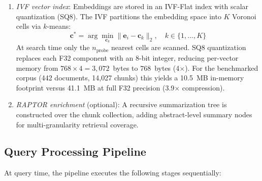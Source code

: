 \documentclass[conference]{IEEEtran}
\begin{document}
\begin{enumerate}
  \item \textit{IVF vector index}: Embeddings are stored in an IVF-Flat
        index with scalar quantization (SQ8). The IVF partitions the embedding
        space into $K$ Voronoi cells via $k$-means:
        \begin{equation}
          \mathbf{c}^* = \arg\min_{\mathbf{c}_k}
            \|\mathbf{e}_i - \mathbf{c}_k\|_2, \quad k \in \{1,\ldots,K\}
          \label{eq:ivf}
        \end{equation}
        At search time only the $n_{\text{probe}}$ nearest cells are scanned.
        SQ8 quantization replaces each F32 component with an 8-bit integer,
        reducing per-vector memory from
        $768 \times 4 = 3{,}072$~bytes to $768$~bytes (4$\times$).
        For the benchmarked corpus (442 documents, 14{,}027 chunks) this yields
        a 10.5~MB in-memory footprint versus 41.1~MB at full F32 precision
        (3.9$\times$ compression).

  \item \textit{RAPTOR enrichment} (optional): A recursive summarization tree
        is constructed over the chunk collection, adding abstract-level
        summary nodes for multi-granularity retrieval coverage.
\end{enumerate}

\subsection{Query Processing Pipeline}
At query time, the pipeline executes the following stages sequentially:
\end{document}
